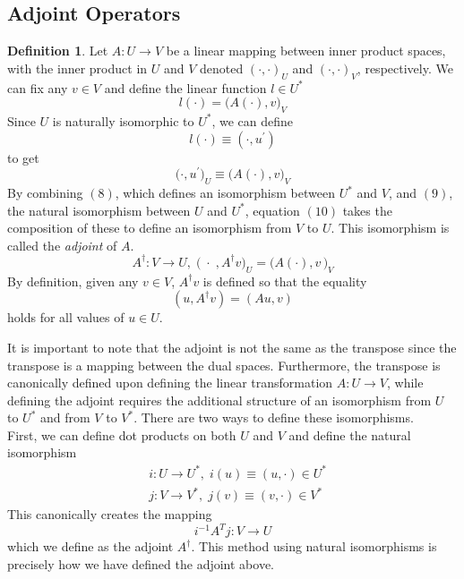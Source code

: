 \documentclass{article}
\theoremstyle{remark}
\theoremstyle{definition}
\newtheorem{definition}{Definition}[section]
\begin{document}
\subsection{Adjoint Operators}
\begin{definition}
Let $A: U \longrightarrow V$ be a linear mapping between inner product spaces, with the inner product in $U$ and $V$ denoted $(\cdot,\cdot)_U$ and $(\cdot,\cdot)_V$, respectively. We can fix any $v \in V$ and define the linear function $l \in U^*$
\begin{equation}
    l(\cdot) = \big(A(\cdot), v\big)_V
\end{equation}
Since $U$ is naturally isomorphic to $U^*$, we can define
\begin{equation}
    l(\cdot) \equiv (\cdot, u^\prime)
\end{equation} 
to get 
\begin{equation}
    \big(\cdot, u^\prime \big)_U \equiv \big(A(\cdot), v \big)_V
\end{equation}
By combining $(8)$, which defines an isomorphism between $U^*$ and $V$, and $(9)$, the natural isomorphism between $U$ and $U^*$, equation $(10)$ takes the composition of these to define an isomorphism from $V$ to $U$. This isomorphism is called the \textit{adjoint} of $A$. 
\[A^\dagger: V \longrightarrow U, \;  \big(\; \cdot \;, A^\dagger v \big)_U = \big( A(\cdot), v \,\big)_V \]
By definition, given any $v \in V$, $A^\dagger v$ is defined so that the equality
\[(u, A^\dagger v) = (A u, v)\]
holds for all values of $u \in U$. 
\end{definition}

It is important to note that the adjoint is not the same as the transpose since the transpose is a mapping between the dual spaces. Furthermore, the transpose is canonically defined upon defining the linear transformation $A: U \longrightarrow V$, while defining the adjoint requires the additional structure of an isomorphism from $U$ to $U^*$ and from $V$ to $V^*$. There are two ways to define these isomorphisms. \\

First, we can define dot products on both $U$ and $V$ and define the natural isomorphism 
\begin{align*}
    &i: U \longrightarrow U^*, \; i(u) \equiv (u, \cdot) \in U^*\\
    &j: V \longrightarrow V^*, \; j(v) \equiv (v, \cdot) \in V^*
\end{align*}
This canonically creates the mapping 
\[i^{-1} A^T j: V \longrightarrow U\]
which we define as the adjoint $A^\dagger$. This method using natural isomorphisms is precisely how we have defined the adjoint above. \\
\end{document}
